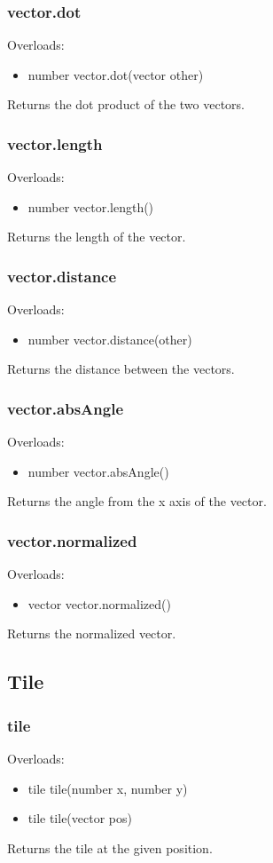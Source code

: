 \documentclass{book}
\newenvironment{ulist}
	{\begin{itemize}
			\itemsep0em}
	{\end{itemize}}
\begin{document}
\subsubsection{vector.dot}
Overloads:
\begin{ulist}
	\item number vector.dot(vector other)
\end{ulist}
Returns the dot product of the two vectors.

\subsubsection{vector.length}
Overloads:
\begin{ulist}
	\item number vector.length()
\end{ulist}
Returns the length of the vector.

\subsubsection{vector.distance}
Overloads:
\begin{ulist}
	\item number vector.distance(other)
\end{ulist}
Returns the distance between the vectors.

\subsubsection{vector.absAngle}
Overloads:
\begin{ulist}
	\item number vector.absAngle()
\end{ulist}
Returns the angle from the x axis of the vector.

\subsubsection{vector.normalized}
Overloads:
\begin{ulist}
	\item vector vector.normalized()
\end{ulist}
Returns the normalized vector.

\subsection{Tile}
\subsubsection{tile}
Overloads:
\begin{ulist}
	\item tile tile(number x, number y)
	\item tile tile(vector pos)
\end{ulist}
Returns the tile at the given position.
\end{document}
